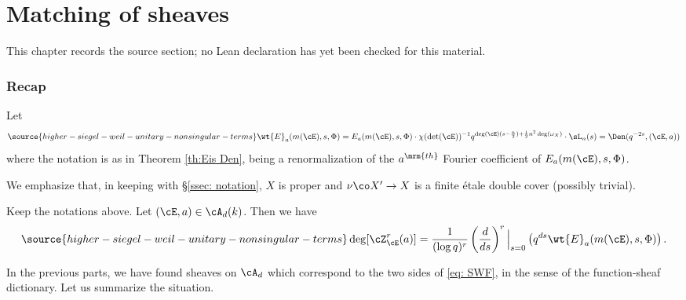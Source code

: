 \chapter{Matching of sheaves}
\label{higher-siegel-weil-unitary-nonsingular-terms-chapter-12}

\begin{remark}
\label{higher-siegel-weil-unitary-nonsingular-terms-chapter-12-source}
This chapter records the source section; no Lean declaration has yet been checked for this material.
\notready
\end{remark}

\subsection{Recap}
Let
\begin{equation}\label{eq: normalized Eisenstein coefficients}
\source{higher-siegel-weil-unitary-nonsingular-terms}
\wt{E}_{a}(m(\cE),s,\Phi)   = E_a(m(\cE), s, \Phi) \cdot \chi(\det(\cE))^{-1} q^{\deg(\cE)( s-\frac{n}{2})+\frac{1}{2}n^2\deg(\omega_X) } \cdot  \sL_n(s) = \Den(q^{-2s}, (\cE,a))
\end{equation}
where the notation is as in Theorem \ref{th:Eis Den}, being a renormalization of the $a^{\mrm{th}}$ Fourier coefficient of $E_a(m(\cE), s, \Phi)$.

We emphasize that, in keeping with \S \ref{ssec: notation}, $X$ is proper and $\nu \co X' \rightarrow X$ is a finite \'{e}tale double cover (possibly trivial).

\begin{thm}
\notready\label{thm: main} Keep the notations above. Let $(\cE,a)\in \cA_{d}(k)$. Then we have
\begin{equation}\label{eq: SWF}
\source{higher-siegel-weil-unitary-nonsingular-terms}
\deg [\cZ_{\cE}^r(a)] = \frac{1}{(\log q)^r}  \left(\frac{d}{ds}\right)^r\Big|_{s=0} \left( q^{ds} \wt{E}_{a}(m(\cE),s,\Phi) \right).
\end{equation}
\end{thm}

In the previous parts, we have found sheaves on $\cA_d$ which correspond to the two sides of \eqref{eq: SWF}, in the sense of the function-sheaf dictionary. Let us summarize the situation.

